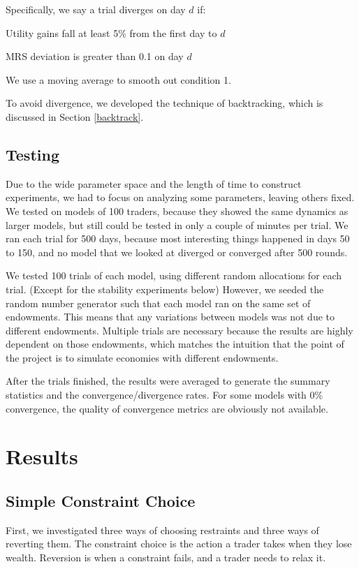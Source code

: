 \documentclass[12pt,a4paper,titlepage]{article}
\begin{document}
Specifically, we say a trial diverges on day $d$ if:
\begin{description}[align=right,labelwidth=2cm,font=\normalfont]
\item[1.] Utility gains fall at least 5\% from the first day to $d$ 
\item[AND 2.] MRS deviation is greater than 0.1 on day $d$
\end{description}
We use a moving average to smooth out condition 1.
    
To avoid divergence, we developed the technique of backtracking, which is discussed in Section \ref{backtrack}.

\subsection{Testing}
Due to the wide parameter space and the length of time to construct experiments, we had to focus on analyzing some parameters, leaving others fixed.
We tested on models of 100 traders, because they showed the same dynamics as larger models, but still could be tested in only a couple of minutes per trial.
We ran each trial for 500 days, because most interesting things happened in days 50 to 150, and no model that we looked at diverged or converged after 500 rounds.

We tested 100 trials of each model, using different random allocations for each trial.
(Except for the stability experiments below)
However, we seeded the random number generator such that each model ran on the same set of endowments.
This means that any variations between models was not due to different endowments.
Multiple trials are necessary because the results are highly dependent on those endowments, which matches the intuition that the point of the project is to simulate economies with different endowments.
    
After the trials finished, the results were averaged to generate the summary statistics and the convergence/divergence rates.
For some models with 0\% convergence, the quality of convergence metrics are obviously not available.

\section{Results}\label{results}
\subsection{Simple Constraint Choice}
First, we investigated three ways of choosing restraints and three ways of reverting them.
The constraint choice is the action a trader takes when they lose wealth.
Reversion is when a constraint fails, and a trader needs to relax it.
\end{document}
